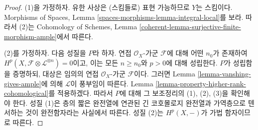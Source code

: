 \begin{proof}
(1)을 가정하자. 유한 사상은 (스킴들로) 표현 가능하므로 $Y$는
스킴이다. Morphisms of Spaces, Lemma
\ref{spaces-morphisms-lemma-integral-local}를 보라. 따라서 (2)는
Cohomology of Schemes, Lemma
\ref{coherent-lemma-surjective-finite-morphism-ample}에서 따른다.

\medskip\noindent
(2)를 가정하자. 다음 성질을 $P$라 하자. 연접 $\mathcal{O}_X$-가군
$\mathcal{F}$에 대해 어떤 $n_0$가 존재하여
$H^p(X, \mathcal{F} \otimes \mathcal{L}^{\otimes n}) = 0$이고, 이는
모든 $n \geq n_0$와 $p > 0$에 대해 성립한다. $P$가 성립함을
증명하되, 대상은 임의의 연접 $\mathcal{O}_X$-가군 $\mathcal{F}$이다.
그러면 Lemma \ref{lemma-vanshing-gives-ample}에 의해 $\mathcal{L}$이
풍부임이 따른다. Lemma
\ref{lemma-property-higher-rank-cohomological}를 적용하겠다. 따라서
$P$에 대해 그 보조정리의 (1), (2), (3)을 확인해야 한다. 성질 (1)은
층의 짧은 완전열에 연관된 긴 코호몰로지 완전열과 가역층으로 텐서하는
것이 완전함자라는 사실에서 따른다. 성질 (2)는 $H^p(X, -)$가 가법
함자이므로 따른다.


\end{proof}
